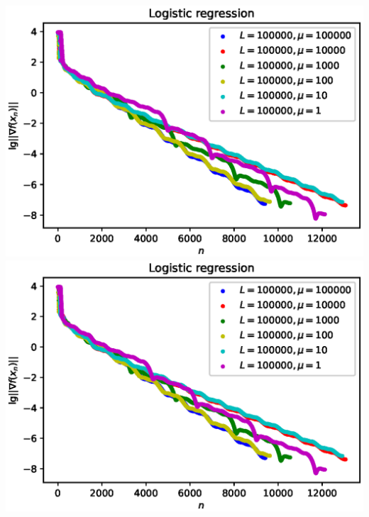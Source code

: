\documentclass{crm-article}
\begin{document}
\noindent
\includegraphics[scale=0.5]{plots/test_acgm1.eps}
\includegraphics[scale=0.5]{plots/test_acgm2.eps}
\end{document}
